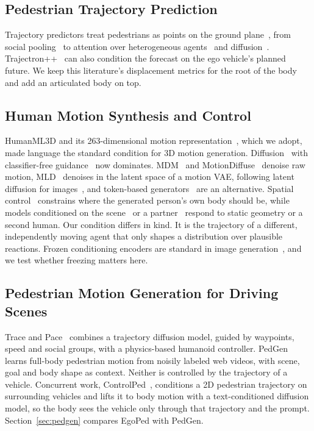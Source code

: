 \documentclass[letterpaper, 10 pt, conference]{ieeeconf}
\newcommand{\method}{EgoPed\xspace}
\begin{document}
\subsection{Pedestrian Trajectory Prediction}

Trajectory predictors treat pedestrians as points on the ground plane~\cite{rudenko2020survey}, from social pooling~\cite{alahi2016sociallstm} to attention over heterogeneous agents~\cite{salzmann2020trajectron} and diffusion~\cite{gu2022mid}. Trajectron++~\cite{salzmann2020trajectron} can also condition the forecast on the ego vehicle's planned future. We keep this literature's displacement metrics for the root of the body and add an articulated body on top.

\subsection{Human Motion Synthesis and Control}

HumanML3D and its 263-dimensional motion representation~\cite{guo2022humanml3d}, which we adopt, made language the standard condition for 3D motion generation. Diffusion~\cite{ho2020ddpm,song2021ddim} with classifier-free guidance~\cite{ho2022cfg} now dominates. MDM~\cite{tevet2023mdm} and MotionDiffuse~\cite{zhang2022motiondiffuse} denoise raw motion, MLD~\cite{chen2023mld} denoises in the latent space of a motion VAE, following latent diffusion for images~\cite{rombach2022sd}, and token-based generators~\cite{guo2024momask} are an alternative. Spatial control~\cite{xie2024omnicontrol} constrains where the generated person's own body should be, while models conditioned on the scene~\cite{jiang2024trumans} or a partner~\cite{liang2024intergen} respond to static geometry or a second human. Our condition differs in kind. It is the trajectory of a different, independently moving agent that only shapes a distribution over plausible reactions. Frozen conditioning encoders are standard in image generation~\cite{rombach2022sd}, and we test whether freezing matters here.

\subsection{Pedestrian Motion Generation for Driving Scenes}

Trace and Pace~\cite{rempe2023tracepace} combines a trajectory diffusion model, guided by waypoints, speed and social groups, with a physics-based humanoid controller. PedGen~\cite{liu2025pedgen} learns full-body pedestrian motion from noisily labeled web videos, with scene, goal and body shape as context. Neither is controlled by the trajectory of a vehicle. Concurrent work, ControlPed~\cite{liu2026controlped}, conditions a 2D pedestrian trajectory on surrounding vehicles and lifts it to body motion with a text-conditioned diffusion model, so the body sees the vehicle only through that trajectory and the prompt. Section~\ref{sec:pedgen} compares \method with PedGen.
\end{document}
